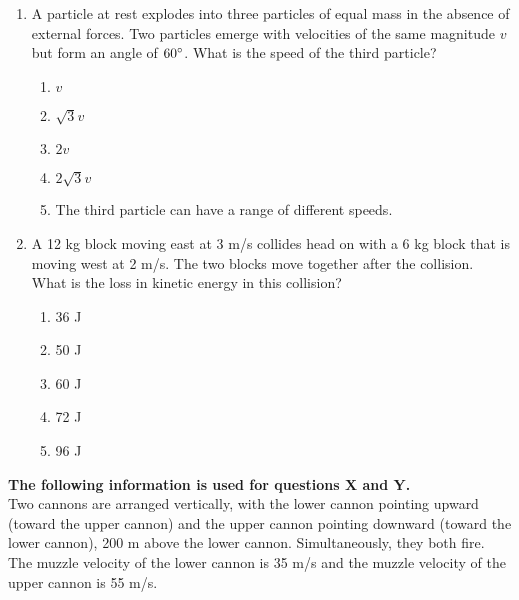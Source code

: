 \documentclass[12pt,letterpaper]{article}
\begin{document}
\begin{enumerate}
\item
A particle at rest explodes into three particles of equal mass in the absence of external forces. Two particles emerge with velocities of the same magnitude $v$ but form an angle of $60\degree$. What is the speed of the third particle?
\begin{enumerate}
\item $v$
\item $\sqrt{3}v$
\item $2v$
\item $2\sqrt{3}v$
\item The third particle can have a range of different speeds.
\end{enumerate}

\item
A 12 kg block moving east at 3 m/s collides head on with a 6 kg block that is moving west at 2 m/s. The two blocks move together after the collision. What is the loss in kinetic energy in this collision?
\begin{enumerate}
\item 36 J
\item 50 J
\item 60 J
\item 72 J
\item 96 J
\end{enumerate}
\end{enumerate}

\textbf{The following information is used for questions X and Y.}\\
Two cannons are arranged vertically, with the lower cannon pointing upward (toward the upper cannon) and the upper cannon pointing downward (toward the lower cannon), 200 m above the lower cannon. Simultaneously, they both fire. The muzzle velocity of the lower cannon is 35 m/s and the muzzle velocity of the upper cannon is 55 m/s.
\end{document}
